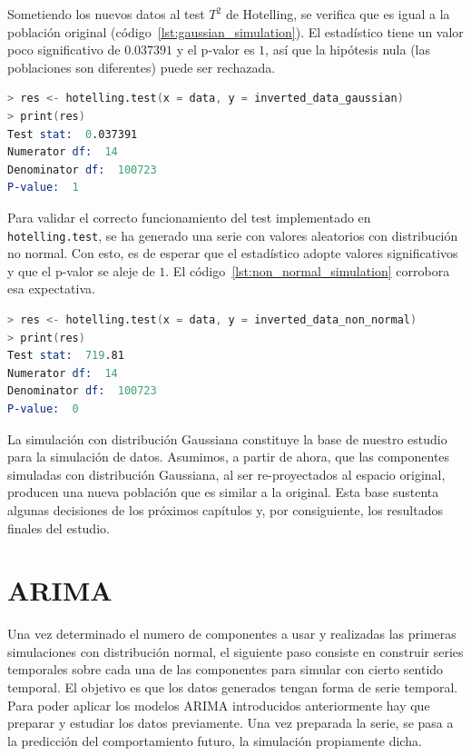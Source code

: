 \documentclass[11pt,spanish,listoffigures,listoftables]{tfgetsinf}
\begin{document}
    Sometiendo los nuevos datos al test \(T^2\) de Hotelling, se verifica que es igual a la población original (código~\ref{lst:gaussian_simulation}). El estadístico tiene un valor poco significativo de \(0.037391\) y el p-valor es \(1\), así que la hipótesis nula (las poblaciones son diferentes) puede ser rechazada.
    
    \begin{lstlisting}[language=S, caption=Test \(T^2\) de Hotelling para la simulación con distribución Gaussiana., label={lst:gaussian_simulation}]
> res <- hotelling.test(x = data, y = inverted_data_gaussian)
> print(res)
Test stat:  0.037391 
Numerator df:  14 
Denominator df:  100723 
P-value:  1 
    \end{lstlisting}
    
    Para validar el correcto funcionamiento del test implementado en {\tt hotelling.test}, se ha generado una serie con valores aleatorios con distribución no normal. Con esto, es de esperar que el estadístico adopte valores significativos y que el p-valor se aleje de \(1\). El código~\ref{lst:non_normal_simulation} corrobora esa expectativa.
   
    \begin{lstlisting}[language=S, caption=Test \(T^2\) de Hotelling para la simulación con distribución no normal., label={lst:non_normal_simulation}]
> res <- hotelling.test(x = data, y = inverted_data_non_normal)
> print(res)
Test stat:  719.81 
Numerator df:  14 
Denominator df:  100723 
P-value:  0 
    \end{lstlisting}

    La simulación con distribución Gaussiana constituye la base de nuestro estudio para la simulación de datos. Asumimos, a partir de ahora, que las componentes simuladas con distribución Gaussiana, al ser re-proyectados al espacio original, producen una nueva población que es similar a la original. Esta base sustenta algunas decisiones de los próximos capítulos y, por consiguiente, los resultados finales del estudio.
        
    \section{ARIMA}
    Una vez determinado el numero de componentes a usar y realizadas las primeras simulaciones con distribución normal, el siguiente paso consiste en construir series temporales sobre cada una de las componentes para simular con cierto sentido temporal. El objetivo es que los datos generados tengan forma de serie temporal. Para poder aplicar los modelos ARIMA introducidos anteriormente hay que preparar y estudiar los datos previamente. Una vez preparada la serie, se pasa a la predicción del comportamiento futuro, la simulación propiamente dicha.
        
\end{document}
